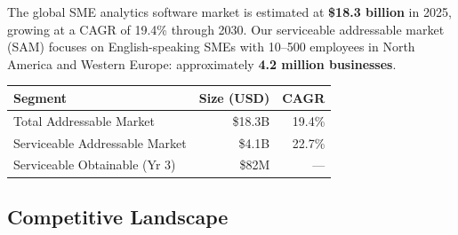 \documentclass[11pt,a4paper]{article}
\begin{document}
\noindent
\begin{minipage}[t]{0.62\linewidth}
The global SME analytics software market is estimated at \textbf{\$18.3 billion} in 2025,
growing at a CAGR of 19.4\% through 2030. Our serviceable addressable market (SAM)
focuses on English-speaking SMEs with 10--500 employees in North America and Western
Europe: approximately \textbf{4.2 million businesses}.

\vspace{6pt}
\begin{tabular}{@{}lrr@{}}
  \toprule
  \rowcolor{NexaNavy}
  \color{white}\textbf{Segment} &
  \color{white}\textbf{Size (USD)} &
  \color{white}\textbf{CAGR} \\
  \midrule
  Total Addressable Market & \$18.3B & 19.4\% \\
  \rowcolor{NexaLight}
  Serviceable Addressable Market & \$4.1B & 22.7\% \\
  Serviceable Obtainable (Yr 3) & \$82M & --- \\
  \bottomrule
\end{tabular}
\end{minipage}\hfill
\begin{minipage}[t]{0.34\linewidth}
\end{minipage}

\par

\subsection{Competitive Landscape}
\end{document}
